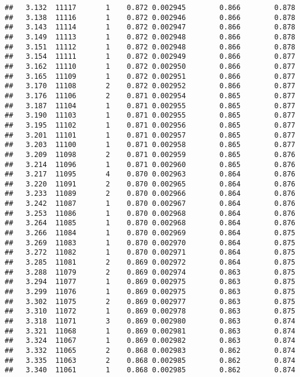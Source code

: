 \documentclass[
]{book}
\begin{document}
\begin{verbatim}
##   3.132  11117       1    0.872 0.002945        0.866        0.878
##   3.138  11116       1    0.872 0.002946        0.866        0.878
##   3.143  11114       1    0.872 0.002947        0.866        0.878
##   3.149  11113       1    0.872 0.002948        0.866        0.878
##   3.151  11112       1    0.872 0.002948        0.866        0.878
##   3.154  11111       1    0.872 0.002949        0.866        0.877
##   3.162  11110       1    0.872 0.002950        0.866        0.877
##   3.165  11109       1    0.872 0.002951        0.866        0.877
##   3.170  11108       2    0.872 0.002952        0.866        0.877
##   3.176  11106       2    0.871 0.002954        0.865        0.877
##   3.187  11104       1    0.871 0.002955        0.865        0.877
##   3.190  11103       1    0.871 0.002955        0.865        0.877
##   3.195  11102       1    0.871 0.002956        0.865        0.877
##   3.201  11101       1    0.871 0.002957        0.865        0.877
##   3.203  11100       1    0.871 0.002958        0.865        0.877
##   3.209  11098       2    0.871 0.002959        0.865        0.876
##   3.214  11096       1    0.871 0.002960        0.865        0.876
##   3.217  11095       4    0.870 0.002963        0.864        0.876
##   3.220  11091       2    0.870 0.002965        0.864        0.876
##   3.233  11089       2    0.870 0.002966        0.864        0.876
##   3.242  11087       1    0.870 0.002967        0.864        0.876
##   3.253  11086       1    0.870 0.002968        0.864        0.876
##   3.264  11085       1    0.870 0.002968        0.864        0.876
##   3.266  11084       1    0.870 0.002969        0.864        0.875
##   3.269  11083       1    0.870 0.002970        0.864        0.875
##   3.272  11082       1    0.870 0.002971        0.864        0.875
##   3.285  11081       2    0.869 0.002972        0.864        0.875
##   3.288  11079       2    0.869 0.002974        0.863        0.875
##   3.294  11077       1    0.869 0.002975        0.863        0.875
##   3.299  11076       1    0.869 0.002975        0.863        0.875
##   3.302  11075       2    0.869 0.002977        0.863        0.875
##   3.310  11072       1    0.869 0.002978        0.863        0.875
##   3.318  11071       3    0.869 0.002980        0.863        0.874
##   3.321  11068       1    0.869 0.002981        0.863        0.874
##   3.324  11067       1    0.869 0.002982        0.863        0.874
##   3.332  11065       2    0.868 0.002983        0.862        0.874
##   3.335  11063       2    0.868 0.002985        0.862        0.874
##   3.340  11061       1    0.868 0.002985        0.862        0.874

\end{verbatim}
\end{document}
